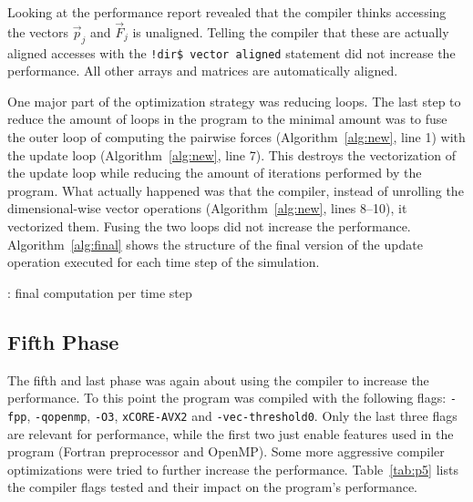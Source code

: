 \documentclass[twoside,11pt]{article}
\begin{document}
Looking at the performance report revealed that the compiler thinks
accessing the vectors $\vec{p}_j$ and $\vec{F}_j$ is unaligned.
Telling the compiler that these are actually aligned accesses with
the \texttt{!dir\$ vector aligned} statement did not increase the
performance.
All other arrays and matrices are automatically aligned.

One major part of the optimization strategy was reducing loops.
The last step to reduce the amount of loops in the program to the
minimal amount was to fuse the outer loop of computing the
pairwise forces (Algorithm~\ref{alg:new}, line 1) with the update loop
(Algorithm~\ref{alg:new}, line 7).
This destroys the vectorization of the update loop while reducing the
amount of iterations performed by the program.
What actually happened was that the compiler, instead of unrolling the
dimensional-wise vector operations (Algorithm~\ref{alg:new}, lines
8--10), it vectorized them.
Fusing the two loops did not increase the performance.
Algorithm~\ref{alg:final} shows the structure of the final version of
the update operation executed for each time step of the simulation.

\begin{algorithm} %
  \caption{: final computation per time step}
  \label{alg:final}

  \begin{algorithmic}[1]


      \ENDFOR

    \ENDFOR

  \end{algorithmic}
\end{algorithm} %


\subsection{Fifth Phase} %

The fifth and last phase was again about using the compiler to
increase the performance.
To this point the program was compiled with the following flags:
\texttt{-fpp}, \texttt{-qopenmp}, \texttt{-O3}, \texttt{xCORE-AVX2}
and \texttt{-vec-threshold0}.
Only the last three flags are relevant for performance, while the
first two just enable features used in the program (Fortran
preprocessor and OpenMP).
Some more aggressive compiler optimizations were tried to further
increase the performance.
Table~\ref{tab:p5} lists the compiler flags tested and their impact on
the program's performance.
\end{document}
